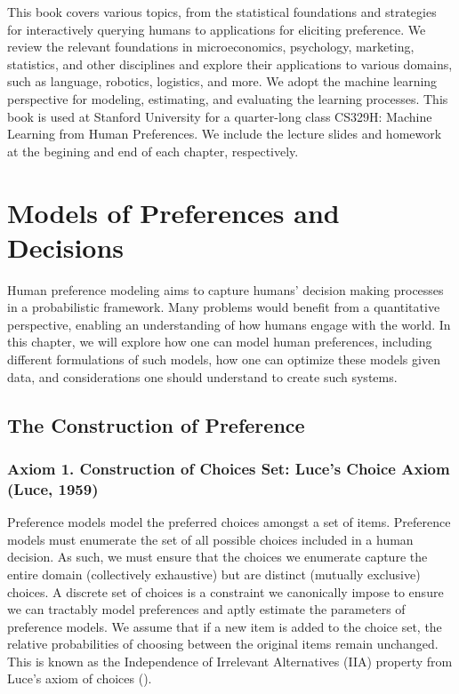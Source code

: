 \documentclass[
  letterpaper,
  numbers=noenddot,
  DIV=11]{scrreprt}
\let\oldchapter\chapter
\def\chapter{%
  \setcounter{sidenote}{1}%
  \oldchapter
}
\theoremstyle{definition}
\theoremstyle{plain}
\theoremstyle{plain}
\theoremstyle{remark}
\begin{document}
This book covers various topics, from the statistical foundations and
strategies for interactively querying humans to applications for
eliciting preference. We review the relevant foundations in
microeconomics, psychology, marketing, statistics, and other disciplines
and explore their applications to various domains, such as language,
robotics, logistics, and more. We adopt the machine learning perspective
for modeling, estimating, and evaluating the learning processes. This
book is used at Stanford University for a quarter-long class CS329H:
Machine Learning from Human Preferences. We include the lecture slides
and homework at the begining and end of each chapter, respectively.


\chapter{Models of Preferences and
Decisions}\label{models-of-preferences-and-decisions}

Human preference modeling aims to capture humans' decision making
processes in a probabilistic framework. Many problems would benefit from
a quantitative perspective, enabling an understanding of how humans
engage with the world. In this chapter, we will explore how one can
model human preferences, including different formulations of such
models, how one can optimize these models given data, and considerations
one should understand to create such systems.

\section{The Construction of Preference}\label{sec-foundations}

\subsection{Axiom 1. Construction of Choices Set: Luce's Choice Axiom
(Luce, 1959)}\label{axiom-1-preference-models-model-choice}

Preference models model the preferred choices amongst a set of items.
Preference models must enumerate the set of all possible choices
included in a human decision. As such, we must ensure that the choices
we enumerate capture the entire domain (collectively exhaustive) but are
distinct (mutually exclusive) choices. A discrete set of choices is a
constraint we canonically impose to ensure we can tractably model
preferences and aptly estimate the parameters of preference models. We
assume that if a new item is added to the choice set, the relative
probabilities of choosing between the original items remain unchanged.
This is known as the Independence of Irrelevant Alternatives (IIA)
property from Luce's axiom of choices ().
\end{document}

